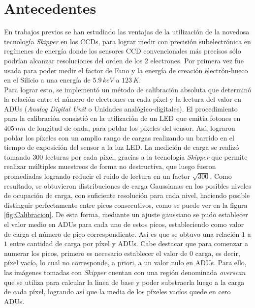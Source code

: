 \section{Antecedentes}

\noindent En trabajos previos se han estudiado las ventajas de la utilización de la novedosa tecnología \textit{Skipper} en los CCDs, para lograr medir con precisión subelectrónica en regímenes de energía donde los sensores CCD convencionales más precisos sólo podrían alcanzar resoluciones del orden de los $2$ electrones. Por primera vez fue usada para poder medir el factor de Fano y la energía de creación electrón-hueco en el Silicio a una energía de $5.9\,\si{keV}$ a $123\,\si{K}$\cite{Rodrigues}.\\
\indent Para lograr esto, se implementó un método de calibración absoluta que determinó la relación entre el número de electrones en cada píxel y la lectura del valor en ADUs (\textit{Analog Digital Unit} o Unidades analógico-digitales). El procedimiento para la calibración consistió en la utilización de un LED %
que emitía fotones en $405\,\si{nm}$ de longitud de onda, para poblar los píxeles del sensor. Así, lograron poblar los píxeles con un amplio rango de cargas realizando un barrido en el tiempo de exposición del sensor a la luz LED. La medición de carga se realizó tomando $300$ lecturas por cada píxel, gracias a la tecnología \textit{Skipper} que permite realizar múltiples muestreos de forma no destructiva, que luego fueron promediadas logrando reducir el ruido de lectura en un factor $\sqrt{300}$. Como resultado, se obtuvieron distribuciones de carga Gaussianas en los posibles niveles de ocupación de carga, con suficiente resolución para cada nivel, haciendo posible distinguir perfectamente entre picos consecutivos, como se puede ver en la figura \ref{fig:Calibracion}. De esta forma, mediante un ajuste gaussiano se pudo establecer el valor medio en ADUs para cada uno de estos picos, estableciendo como valor de carga el número de pico correspondiente. Así es que se obtuvo una relación $1$ a $1$ entre cantidad de carga por píxel y ADUs. Cabe destacar que para comenzar a numerar los picos, primero es necesario establecer el valor de $0$ carga, es decir, píxel vacío, lo cual no corresponde, a priori, a un valor nulo en ADUs. Para ello, las imágenes tomadas con \textit{Skipper} cuentan con una región denominada \textit{overscan} que se utiliza para calcular la linea de base y poder substraerla luego a la carga de cada píxel, logrando así que la media de los píxeles vacíos quede en cero ADUs.
